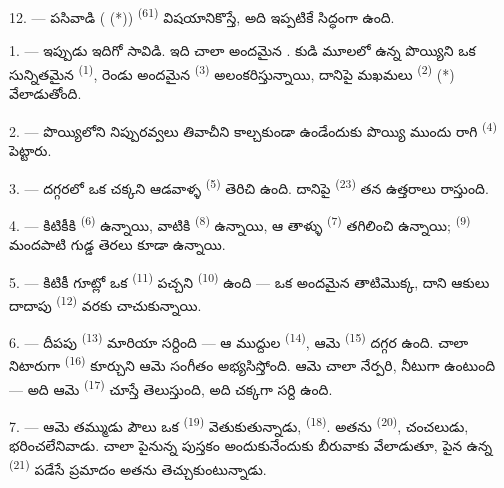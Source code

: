 12. --- పసివాడి ( (*))  \textsuperscript{(61)} విషయానికొస్తే, అది
ఇప్పటికే సిద్ధంగా ఉంది.

\VUsaut{5.0mm}
\VUsaut{3.0mm}

1. --- ఇప్పుడు ఇదిగో సావిడి. ఇది చాలా అందమైన . కుడి మూలలో ఉన్న పొయ్యిని ఒక
సున్నితమైన  \textsuperscript{(1)}, రెండు అందమైన 
\textsuperscript{(3)} అలంకరిస్తున్నాయి, దానిపై మఖమలు  \textsuperscript{(2)} (*)
వేలాడుతోంది.

2. --- పొయ్యిలోని నిప్పురవ్వలు తివాచీని కాల్చకుండా ఉండేందుకు పొయ్యి ముందు రాగి
 \textsuperscript{(4)} పెట్టారు.

3. --- దగ్గరలో ఒక చక్కని ఆడవాళ్ళ  \textsuperscript{(5)} తెరిచి ఉంది. దానిపై
 \textsuperscript{(23)} తన ఉత్తరాలు రాస్తుంది.

4. --- కిటికీకి  \textsuperscript{(6)} ఉన్నాయి, వాటికి
 \textsuperscript{(8)} ఉన్నాయి, ఆ తాళ్ళు 
\textsuperscript{(7)} తగిలించి ఉన్నాయి;  \textsuperscript{(9)} మందపాటి
గుడ్డ తెరలు కూడా ఉన్నాయి.

5. --- కిటికీ గూట్లో ఒక  \textsuperscript{(11)} పచ్చని 
\textsuperscript{(10)} ఉంది — ఒక అందమైన తాటిమొక్క, దాని ఆకులు దాదాపు 
\textsuperscript{(12)} వరకు చాచుకున్నాయి.

6. --- దీపపు  \textsuperscript{(13)} మారియా సర్దింది — ఆ ముద్దుల
 \textsuperscript{(14)}, ఆమె  \textsuperscript{(15)} దగ్గర ఉంది.
చాలా నిటారుగా  \textsuperscript{(16)} కూర్చుని ఆమె సంగీతం అభ్యసిస్తోంది. ఆమె
చాలా నేర్పరి, నీటుగా ఉంటుంది — అది ఆమె  \textsuperscript{(17)} చూస్తే
తెలుస్తుంది, అది చక్కగా సర్ది ఉంది.

\VUsaut{5.0mm}
\VUsaut{3.0mm}

7. --- ఆమె తమ్ముడు పౌలు ఒక  \textsuperscript{(19)} వెతుకుతున్నాడు,
 \textsuperscript{(18)}. అతను 
\textsuperscript{(20)}, చంచలుడు, భరించలేనివాడు. చాలా పైనున్న పుస్తకం అందుకునేందుకు బీరువాకు
వేలాడుతూ, పైన ఉన్న  \textsuperscript{(21)} పడేసే ప్రమాదం అతను
తెచ్చుకుంటున్నాడు.

